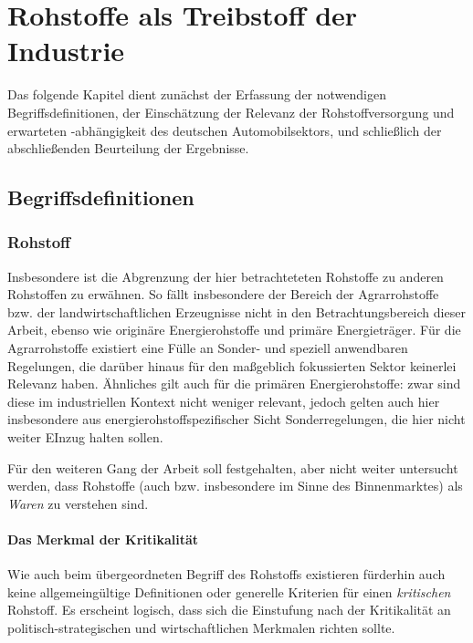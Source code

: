 \documentclass[12pt,a4paper,oneside]{book} %
\begin{document}
	
	
	\chapter{Rohstoffe als Treibstoff der Industrie}
	
	Das folgende Kapitel dient zunächst der Erfassung der notwendigen Begriffsdefinitionen, der Einschätzung der Relevanz der Rohstoffversorgung und erwarteten -abhängigkeit des deutschen Automobilsektors, und schließlich der abschließenden Beurteilung der Ergebnisse.
	
	\section{Begriffsdefinitionen}
	
	\subsection{Rohstoff}
	
	
 Insbesondere ist die Abgrenzung der hier betrachteteten Rohstoffe zu anderen Rohstoffen zu erwähnen. So fällt insbesondere der Bereich der Agrarrohstoffe bzw. der landwirtschaftlichen Erzeugnisse nicht in den Betrachtungsbereich dieser Arbeit, ebenso wie originäre Energierohstoffe und primäre Energieträger. Für die Agrarrohstoffe existiert eine Fülle an Sonder- und speziell anwendbaren Regelungen, die darüber hinaus für den maßgeblich fokussierten Sektor keinerlei Relevanz haben. Ähnliches gilt auch für die primären Energierohstoffe: zwar sind diese im industriellen Kontext nicht weniger relevant, jedoch gelten auch hier insbesondere aus energierohstoffspezifischer Sicht Sonderregelungen, die hier nicht weiter EInzug halten sollen.
	
	
	Für den weiteren Gang der Arbeit soll festgehalten, aber nicht weiter untersucht werden, dass Rohstoffe (auch bzw. insbesondere im Sinne des Binnenmarktes) als \textit{Waren} zu verstehen sind.\autocite{Schorkopf, Rohstoffverwaltung, Rn. 6ff.}
	
	
	\subsubsection{Das Merkmal der Kritikalität}
	Wie auch beim übergeordneten Begriff des Rohstoffs existieren fürderhin auch keine allgemeingültige Definitionen oder generelle Kriterien für einen \textit{kritischen} Rohstoff. Es erscheint logisch, dass sich die Einstufung nach der Kritikalität an politisch-strategischen und wirtschaftlichen Merkmalen richten sollte.
	
\end{document}
